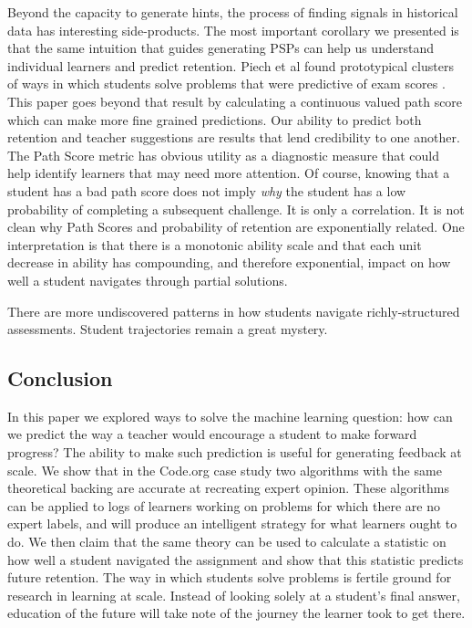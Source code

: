 Beyond the capacity to generate hints, the process of finding signals in historical data has interesting side-products. The most important corollary we presented is that the same intuition that guides generating PSPs can help us understand individual learners and predict retention. Piech et al found prototypical clusters of ways in which students solve problems that were predictive of exam scores \cite{piech2012modeling}. This paper goes beyond that result by calculating a continuous valued path score which can make more fine grained predictions. Our ability to predict both retention and teacher suggestions are results that lend credibility to one another. The Path Score metric has obvious utility as a diagnostic measure that could help identify learners that may need more attention. Of course, knowing that a student has a bad path score does not imply \emph{why} the student has a low probability of completing a subsequent challenge. It is only a correlation. It is not clean why Path Scores and probability of retention are exponentially related. One interpretation is that there is a monotonic ability scale and that each unit decrease in ability has compounding, and therefore exponential, impact on how well a student navigates through partial solutions. 

There are more undiscovered patterns in how students navigate richly-structured assessments. Student trajectories remain a great mystery.

\subsection{Conclusion}

In this paper we explored ways to solve the machine learning question: how can we predict the way a teacher would encourage a student to make forward progress? The ability to make such prediction is useful for generating feedback at scale. We show that in the Code.org case study two algorithms with the same theoretical backing are accurate at recreating expert opinion. These algorithms can be applied to logs of learners working on problems for which there are no expert labels, and will produce an intelligent strategy for what learners ought to do. We then claim that the same theory can be used to calculate a statistic on how well a student navigated the assignment and show that this statistic predicts future retention. The way in which students solve problems is fertile ground for research in learning at scale. Instead of looking solely at a student's final answer, education of the future will take note of the journey the learner took to get there.

